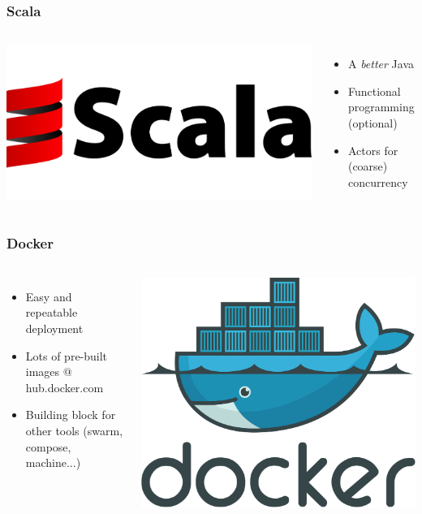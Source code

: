 \documentclass{beamer}
\begin{document}
\begin{frame}
  \frametitle{Scala}
  \begin{columns}
  \includegraphics[width=\textwidth]{images/scalalogo.png}
  \begin{itemize}
    \item A \textit{better} Java
    \item Functional programming (optional)
    \item Actors for (coarse) concurrency
  \end{itemize}
\end{columns}
\end{frame}

\begin{frame}
  \frametitle{Docker}
  \begin{columns}
  \begin{itemize}
    \item Easy and repeatable deployment
    \item Lots of pre-built images @ hub.docker.com
    \item Building block for other tools (swarm, compose, machine...)
  \end{itemize}
  \includegraphics[width=\textwidth]{images/docker_logo.png}
\end{columns}
\end{frame}
\end{document}
